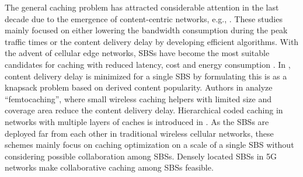 \documentclass[conference]{IEEEtran}
\begin{document}
The general caching problem has attracted considerable attention in the last decade due to the emergence of content-centric networks, e.g., \cite{6655114,7636877}. %
These studies mainly focused on either lowering the bandwidth consumption during the peak traffic times or the content delivery delay by developing efficient algorithms. 
With the advent of cellular edge networks, SBSs have become the most suitable candidates for caching with reduced latency, cost and energy consumption \cite{7445129}. 
In \cite{6883600}, content delivery delay is minimized for a single SBS by formulating this is as a knapsack problem \cite{10.5555/98124} based on derived content popularity. Authors in \cite{6600983} analyze ``femtocaching'', where small wireless caching helpers with limited size and coverage area reduce the content delivery delay. 
Hierarchical coded caching in networks with multiple layers of caches is introduced in \cite{7458151}. As the SBSs are deployed far from each other in traditional wireless cellular networks, these schemes mainly focus on caching optimization on a scale of a single SBS without considering possible collaboration among SBSs. Densely located SBSs in 5G networks make collaborative caching among SBSs feasible.
\end{document}
